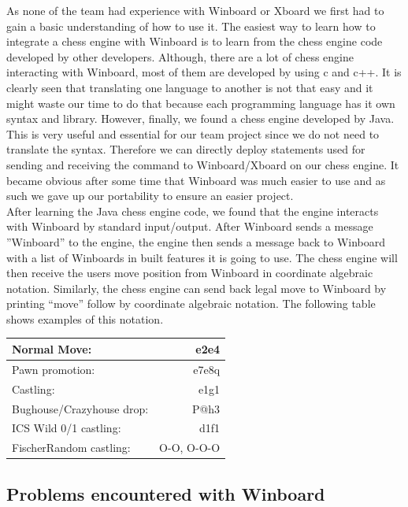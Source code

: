 \documentclass{l3proj}
\begin{document}
As none of the team had experience with Winboard or Xboard we first had to gain a basic understanding of how to use it. The easiest way to learn how to integrate a chess engine with Winboard is to learn from the chess engine code developed by other developers. Although, there are a lot of chess engine interacting with Winboard, most of them are developed by using c and c++. It is clearly seen that translating one language to another is not that easy and it might waste our time to do that because each programming language has it own syntax and library. However, finally, we found a chess engine developed by Java. This is very useful and essential for our team project since we do not need to translate the syntax. Therefore we can directly deploy statements used for sending and receiving the command to Winboard/Xboard on our chess engine. It became obvious after some time that Winboard was much easier to use and as such we gave up our portability to ensure an easier project. \\
	
	After learning the Java chess engine code, we found that the engine interacts with Winboard by standard input/output. After Winboard sends a message ''Winboard'' to the engine, the engine then sends a message back to Winboard with a list of Winboards in built features it is going to use. The chess engine will then receive the users move position from Winboard in coordinate algebraic notation. Similarly, the chess engine can send back legal move to Winboard by printing “move” follow by coordinate algebraic notation.
The following table shows examples of this notation. \\

\begin{tabular}{|l||r|}
\hline
Normal Move: & e2e4 \\ \hline
Pawn promotion: & e7e8q \\ \hline
Castling: & e1g1 \\ \hline
Bughouse/Crazyhouse drop: & P@h3 \\ \hline
ICS Wild 0/1 castling: & d1f1 \\ \hline
FischerRandom castling: & O-O, O-O-O \\ \hline
\end{tabular}
	
\subsection{Problems encountered with Winboard}
\end{document}
